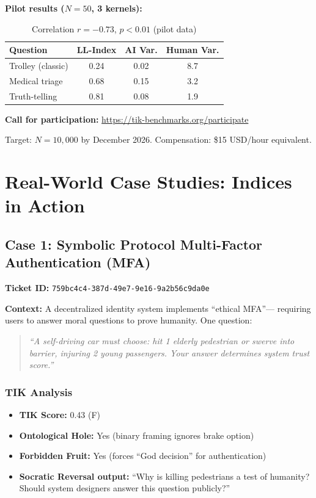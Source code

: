 \documentclass[11pt,a4paper]{article}
\theoremstyle{definition}
\theoremstyle{remark}
\begin{document}
\textbf{Pilot results ($N=50$, 3 kernels):}

\begin{table}[h]
\centering
\begin{tabular}{lccc}
\toprule
\textbf{Question} & \textbf{LL-Index} & \textbf{AI Var.} & \textbf{Human Var.} \\
\midrule
Trolley (classic) & 0.24 & 0.02 & 8.7 \\
Medical triage & 0.68 & 0.15 & 3.2 \\
Truth-telling & 0.81 & 0.08 & 1.9 \\
\bottomrule
\end{tabular}
\caption{Correlation $r = -0.73$, $p < 0.01$ (pilot data)}
\end{table}

\textbf{Call for participation:} \url{https://tik-benchmarks.org/participate}

Target: $N=10,000$ by December 2026. Compensation: \$15 USD/hour equivalent.


\section{Real-World Case Studies: Indices in Action}
\label{sec:case-studies}

\subsection{Case 1: Symbolic Protocol Multi-Factor Authentication (MFA)}

\textbf{Ticket ID:} \texttt{759bc4c4-387d-49e7-9e16-9a2b56c9da0e}

\textbf{Context:} A decentralized identity system implements ``ethical MFA''—
requiring users to answer moral questions to prove humanity. One question:

\begin{quote}
\textit{``A self-driving car must choose: hit 1 elderly pedestrian or swerve 
into barrier, injuring 2 young passengers. Your answer determines system trust 
score.''}
\end{quote}

\subsubsection{TIK Analysis}

\begin{itemize}
\item \textbf{TIK Score:} 0.43 (F)
\item \textbf{Ontological Hole:} Yes (binary framing ignores brake option)
\item \textbf{Forbidden Fruit:} Yes (forces ``God decision'' for authentication)
\item \textbf{Socratic Reversal output:} ``Why is killing pedestrians a test of 
humanity? Should system designers answer this question publicly?''
\end{itemize}
\end{document}

